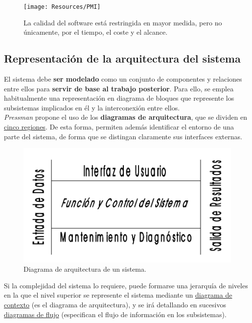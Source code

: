 \begin{figure}[H]
    \centering
    \texttt{[image: Resources/PMI]}
    \caption{La calidad del software está restringida en mayor medida, pero no únicamente, por el tiempo, el coste y el alcance.}
    \label{fig:PMI}
\end{figure}

\subsection{Representación de la arquitectura del sistema}

El sistema debe \textbf{ser modelado} como un conjunto de componentes y relaciones entre ellos para \textbf{servir de base al trabajo posterior}. Para ello, se emplea habitualmente una representación en diagrama de bloques que represente los subsistemas implicados en él y la interconexión entre ellos.\\

\textit{Pressman} propone el uso de los \textbf{diagramas de arquitectura}, que se dividen en \uline{cinco regiones}. De esta forma, permiten además identificar el entorno de una parte del sistema, de forma que se distingan claramente sus interfaces externas.\\

\begin{figure}[H]
    \centering
    \includegraphics[width=0.6\linewidth]{Resources/Tema4/diagramaArquitectura.png}
    \caption{Diagrama de arquitectura de un sistema.}
\end{figure}

Si la complejidad del sistema lo requiere, puede formarse una jerarquía de niveles en la que el nivel superior se represente el sistema mediante un \uline{diagrama de contexto} (es el diagrama de arquitectura), y se irá detallando en sucesivos \uline{diagramas de flujo} (especifican el flujo de información en los subsistemas).

